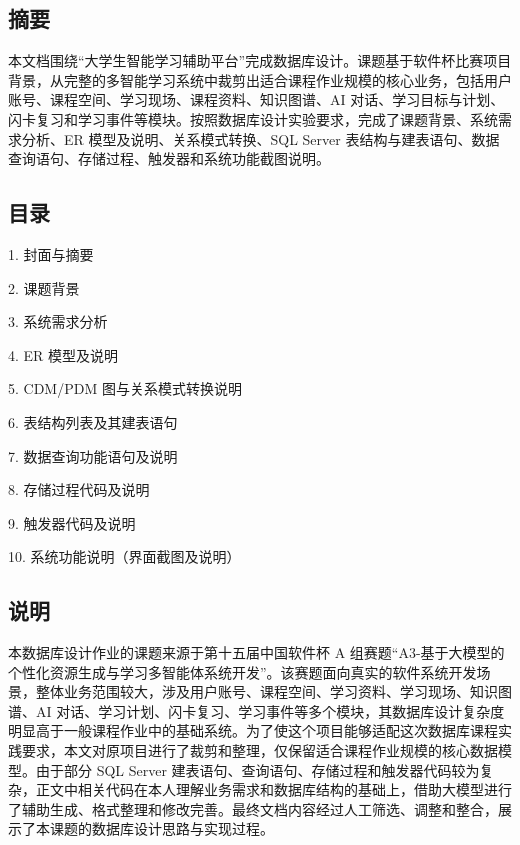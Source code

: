 \documentclass[10pt,a4paper,fontset=none]{ctexart}
\begin{document}
\subsection*{摘要}

本文档围绕“大学生智能学习辅助平台”完成数据库设计。课题基于软件杯比赛项目背景，从完整的多智能学习系统中裁剪出适合课程作业规模的核心业务，包括用户账号、课程空间、学习现场、课程资料、知识图谱、AI 对话、学习目标与计划、闪卡复习和学习事件等模块。按照数据库设计实验要求，完成了课题背景、系统需求分析、ER 模型及说明、关系模式转换、SQL Server 表结构与建表语句、数据查询语句、存储过程、触发器和系统功能截图说明。\par

\subsection*{目录}

1. 封面与摘要\par
2. 课题背景\par
3. 系统需求分析\par
4. ER 模型及说明\par
5. CDM/PDM 图与关系模式转换说明\par
6. 表结构列表及其建表语句\par
7. 数据查询功能语句及说明\par
8. 存储过程代码及说明\par
9. 触发器代码及说明\par
10. 系统功能说明（界面截图及说明）\par

\subsection*{说明}

本数据库设计作业的课题来源于第十五届中国软件杯 A 组赛题“A3-基于大模型的个性化资源生成与学习多智能体系统开发”。该赛题面向真实的软件系统开发场景，整体业务范围较大，涉及用户账号、课程空间、学习资料、学习现场、知识图谱、AI 对话、学习计划、闪卡复习、学习事件等多个模块，其数据库设计复杂度明显高于一般课程作业中的基础系统。为了使这个项目能够适配这次数据库课程实践要求，本文对原项目进行了裁剪和整理，仅保留适合课程作业规模的核心数据模型。由于部分 SQL Server 建表语句、查询语句、存储过程和触发器代码较为复杂，正文中相关代码在本人理解业务需求和数据库结构的基础上，借助大模型进行了辅助生成、格式整理和修改完善。最终文档内容经过人工筛选、调整和整合，展示了本课题的数据库设计思路与实现过程。\par
\end{document}
